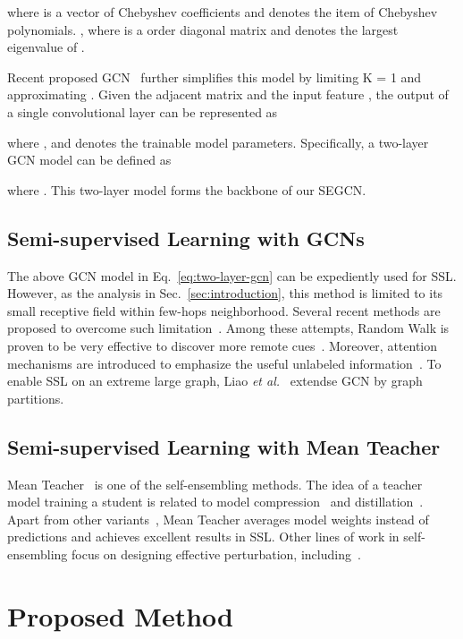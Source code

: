 \documentclass[letterpaper]{article} \usepackage{aaai19}  \usepackage{times}  \usepackage{helvet}  \usepackage{courier}  \usepackage{url}  \usepackage{graphicx}  \usepackage{algorithm}
\begin{document}
where  is a vector of Chebyshev coefficients and  denotes the  item of Chebyshev polynomials. , where  is a  order diagonal matrix and  denotes the largest eigenvalue of .

Recent proposed GCN~\cite{kipf2016semi} further simplifies this model by limiting K = 1 and approximating . Given the adjacent matrix  and the input feature , the output of a single convolutional layer  can be represented as

where ,  and  denotes the trainable model parameters. Specifically, a two-layer GCN model can be defined as

where . This two-layer model forms the backbone of our SEGCN.

\subsection{Semi-supervised Learning with GCNs}
The above GCN model in Eq.~\ref{eq:two-layer-gcn} can be expediently used for SSL. However, as the analysis in Sec.~\ref{sec:introduction}, this method is limited to its small receptive field within few-hops neighborhood. Several recent methods are proposed to overcome such limitation~\cite{weston2012deep,abu2018N-GCN,verma2018feastnet,monti2017Monet}. 
Among these attempts, Random Walk is proven to be very effective to discover more remote cues~\cite{grover2016node2vec,perozzi2014deepwalk}. Moreover, attention mechanisms are introduced to emphasize the useful unlabeled information~\cite{Kiran2018attention,veličković2018GAT,shang2018edge}. To enable SSL on an extreme large graph, Liao \emph{et al.}~\cite{liao2018GPNN} extendse GCN by graph partitions.

\subsection{Semi-supervised Learning with Mean Teacher}
Mean Teacher~\cite{tarvainen2017mean} is one of the self-ensembling methods. The idea of a teacher model training a student is related to model compression~\cite{buciluǎ2006model} and distillation~\cite{hinton2015distilling}. Apart from other variants~\cite{bachman2014learning,laine2016temporal}, Mean Teacher averages model weights instead
of predictions and achieves excellent results in SSL. Other lines of work in self-ensembling focus on designing effective perturbation, including~\cite{gastaldi2017shake,huang2016stochasticdepth,wan2013dropconnect}.


\section{Proposed Method}
\end{document}
